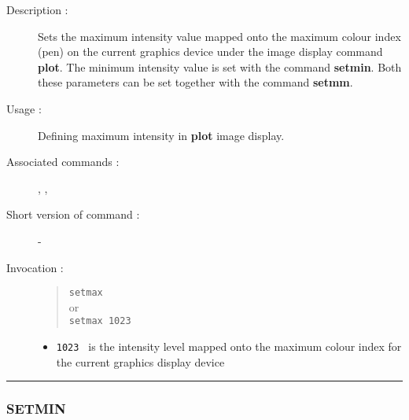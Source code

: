 \begin{description}

\item[Description :] Sets the maximum intensity value mapped onto the
maximum colour index (pen) on the current graphics device under the
image display command {\bf plot}.  The minimum intensity value is set
with the command {\bf setmin}.  Both these parameters can be set
together with the command {\bf setmm}.

\item[Usage :] Defining maximum intensity in {\bf plot} image display.

\item[Associated commands :] {\tt {}}, 
{\tt {}}, {\tt {}}

\item[Short version of command :] -
\item[Invocation :]

\begin{quote}{\tt  setmax }\\
or \\
{\tt setmax 1023 }
\end{quote}

\begin{itemize}

\item {\tt 1023 } is the intensity level mapped onto the maximum colour
 index for the current graphics display device
\end{itemize}

\end{description}

\hrule 
\subsubsection*{\label{SETMIN}SETMIN}

